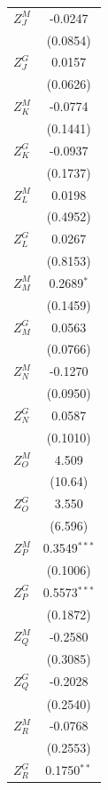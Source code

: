 \begin{tabular}{lc}
   $Z^{M}_J$       & -0.0247\\   
                   & (0.0854)\\   
   $Z^{G}_J$       & 0.0157\\   
                   & (0.0626)\\   
   $Z^{M}_K$       & -0.0774\\   
                   & (0.1441)\\   
   $Z^{G}_K$       & -0.0937\\   
                   & (0.1737)\\   
   $Z^{M}_L$       & 0.0198\\   
                   & (0.4952)\\   
   $Z^{G}_L$       & 0.0267\\   
                   & (0.8153)\\   
   $Z^{M}_M$       & 0.2689$^{*}$\\   
                   & (0.1459)\\   
   $Z^{G}_M$       & 0.0563\\   
                   & (0.0766)\\   
   $Z^{M}_N$       & -0.1270\\   
                   & (0.0950)\\   
   $Z^{G}_N$       & 0.0587\\   
                   & (0.1010)\\   
   $Z^{M}_O$       & 4.509\\   
                   & (10.64)\\   
   $Z^{G}_O$       & 3.550\\   
                   & (6.596)\\   
   $Z^{M}_P$       & 0.3549$^{***}$\\   
                   & (0.1006)\\   
   $Z^{G}_P$       & 0.5573$^{***}$\\   
                   & (0.1872)\\   
   $Z^{M}_Q$       & -0.2580\\   
                   & (0.3085)\\   
   $Z^{G}_Q$       & -0.2028\\   
                   & (0.2540)\\   
   $Z^{M}_R$       & -0.0768\\   
                   & (0.2553)\\   
   $Z^{G}_R$       & 0.1750$^{**}$\\   

\end{tabular}
